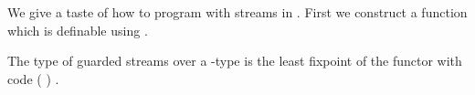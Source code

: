 We give a taste of how to program with streams in \GTT. First we construct a function  which is definable using .
\begin{code}%
\>[0]\AgdaSpace{}%
\AgdaSymbol{:}\AgdaSpace{}%
\AgdaSpace{}%
\AgdaSymbol{\{}\AgdaSymbol{\}}\AgdaSpace{}%
\AgdaSymbol{\{}\AgdaSpace{}%
\AgdaSymbol{:}\AgdaSpace{}%
\AgdaSpace{}%
\AgdaSymbol{\}}\AgdaSpace{}%
\AgdaSymbol{(}\AgdaSpace{}%
\AgdaSymbol{:}\AgdaSpace{}%
\AgdaSpace{}%
\AgdaSymbol{)}\AgdaSpace{}%
\AgdaSpace{}%
\AgdaSpace{}%
\AgdaSpace{}%
\AgdaSymbol{(}\AgdaSpace{}%
\AgdaSymbol{)}\AgdaSpace{}%
\AgdaSpace{}%
\AgdaSpace{}%
\AgdaSpace{}%
\AgdaSymbol{(}\AgdaSpace{}%
\AgdaSpace{}%
\AgdaSymbol{(}\AgdaSpace{}%
\AgdaSymbol{))}\<%
\end{code}
The type of guarded streams over a -type  is the least fixpoint of the functor with code  ( )  .
\begin{code}%
\>[0]\AgdaSpace{}%
\AgdaSymbol{:}\AgdaSpace{}%
\AgdaSpace{}%
\AgdaSpace{}%
\AgdaSpace{}%
\AgdaSpace{}%
\<%
\\
\>[0]\AgdaSpace{}%
\AgdaSpace{}%
\AgdaSymbol{=}\AgdaSpace{}%
\AgdaSpace{}%
\AgdaSymbol{(}\AgdaSpace{}%
\AgdaSymbol{(}\AgdaSpace{}%
\AgdaSymbol{)}\AgdaSpace{}%
\AgdaSpace{}%
\AgdaSpace{}%
\AgdaSymbol{)}\<%
\end{code}
